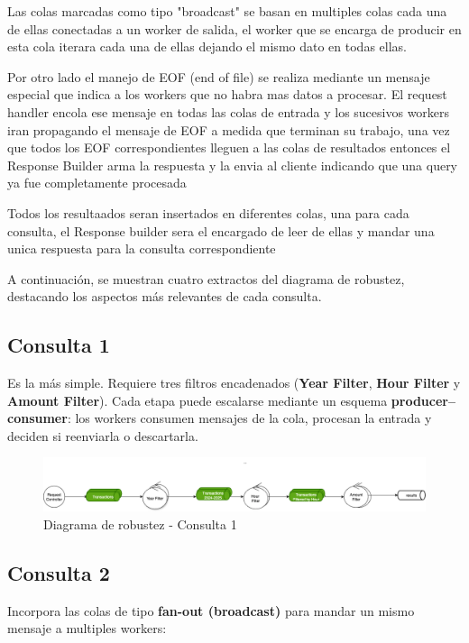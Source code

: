 \documentclass[titlepage,a4paper]{article}
\begin{document}
Las colas marcadas como tipo "broadcast" se basan en multiples colas cada una de ellas conectadas a un worker de salida, el worker que se encarga de producir en esta cola iterara cada una de ellas dejando el mismo dato en todas ellas.

Por otro lado el manejo de EOF (end of file) se realiza mediante un mensaje especial que indica a los workers que no habra mas datos a procesar. El request handler encola ese mensaje en todas las colas de entrada y los sucesivos workers iran propagando el mensaje de EOF a medida que terminan su trabajo, una vez que todos los EOF correspondientes lleguen a las colas de resultados entonces el Response Builder arma la respuesta y la envia al cliente indicando que una query ya fue completamente procesada

Todos los resultaados seran insertados en diferentes colas, una para cada consulta, el Response builder sera el encargado de leer de ellas y mandar una unica respuesta para la consulta correspondiente

A continuación, se muestran cuatro extractos del diagrama de robustez, destacando los aspectos más relevantes de cada consulta.

\subsection*{Consulta 1}
Es la más simple. Requiere tres filtros encadenados (\textbf{Year Filter}, \textbf{Hour Filter} y \textbf{Amount Filter}).  
Cada etapa puede escalarse mediante un esquema \textbf{producer--consumer}: los workers consumen mensajes de la cola, procesan la entrada y deciden si reenviarla o descartarla.

\begin{figure}[H]
    \centering
    \includegraphics[width=1.0\textwidth]{consulta1.png}
    \caption{Diagrama de robustez - Consulta 1}
\end{figure}


\subsection*{Consulta 2}
Incorpora las colas de tipo \textbf{fan-out (broadcast)} para mandar un mismo mensaje a multiples workers:
\end{document}
